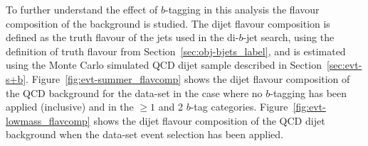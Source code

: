 %


To further understand the effect of $b$-tagging in this analysis the flavour composition of the background is studied.
The dijet flavour composition is defined as the truth flavour of the jets used in the di-$b$-jet search,
using the definition of truth flavour from Section~\ref{sec:obj-bjets_label},
and is estimated using the Monte Carlo simulated QCD dijet sample described in Section~\ref{sec:evt-s+b}.
Figure~\ref{fig:evt-summer_flavcomp} shows the dijet flavour composition of the QCD background for the
\summer{} data-set in the case where no $b$-tagging
has been applied (inclusive) and in the $\geq1$ and 2 $b$-tag categories.
Figure~\ref{fig:evt-lowmass_flavcomp} shows the dijet flavour composition of the QCD dijet background
when the \lm{} data-set event selection has been applied.

